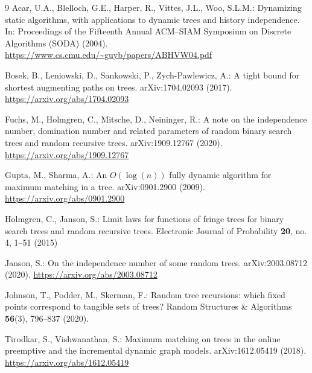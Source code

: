 \documentclass[runningheads,envcountsame,orivec]{llncs}
\begin{document}
\begin{thebibliography}{9}
Acar, U.A., Blelloch, G.E., Harper, R., Vittes, J.L., Woo, S.L.M.:
Dynamizing static algorithms, with applications to dynamic trees and
history independence. In: Proceedings of the Fifteenth Annual ACM--SIAM
Symposium on Discrete Algorithms (SODA) (2004).
\url{https://www.cs.cmu.edu/~guyb/papers/ABHVW04.pdf}

Bosek, B., Leniowski, D., Sankowski, P., Zych-Pawlewicz, A.:
A tight bound for shortest augmenting paths on trees.
arXiv:1704.02093 (2017). \url{https://arxiv.org/abs/1704.02093}

Fuchs, M., Holmgren, C., Mitsche, D., Neininger, R.:
A note on the independence number, domination number and related
parameters of random binary search trees and random recursive trees.
arXiv:1909.12767 (2020). \url{https://arxiv.org/abs/1909.12767}

Gupta, M., Sharma, A.:
An $O(\log(n))$ fully dynamic algorithm for maximum matching in a tree.
arXiv:0901.2900 (2009). \url{https://arxiv.org/abs/0901.2900}

Holmgren, C., Janson, S.:
Limit laws for functions of fringe trees for binary search trees and
random recursive trees. Electronic Journal of Probability \textbf{20},
no. 4, 1--51 (2015)

Janson, S.:
On the independence number of some random trees.
arXiv:2003.08712 (2020). \url{https://arxiv.org/abs/2003.08712}

Johnson, T., Podder, M., Skerman, F.:
Random tree recursions: which fixed points correspond to tangible sets
of trees? Random Structures \& Algorithms \textbf{56}(3), 796--837 (2020).

Tirodkar, S., Vishwanathan, S.:
Maximum matching on trees in the online preemptive and the incremental
dynamic graph models. arXiv:1612.05419 (2018).
\url{https://arxiv.org/abs/1612.05419}
\end{thebibliography}
\end{document}
